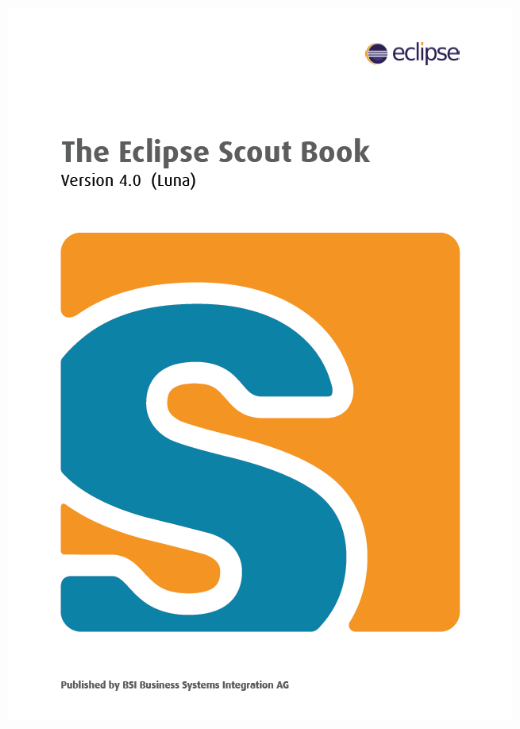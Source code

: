 \documentclass[a4paper,10pt,twoside]{book}
\begin{document}
\ifpdf
  
\else
  \includegraphics{ScoutBookCover.png}
\fi

\thispagestyle{empty}
\frontmatter




\pagestyle{plain}

\tableofcontents
\sloppy


\mainmatter

\end{document}

